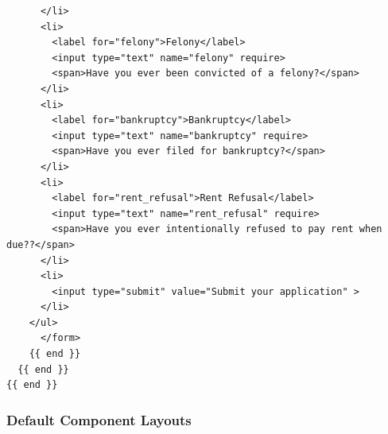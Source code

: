 \documentclass[11pt]{article}
\begin{document}
\begin{enumerate}
\begin{verbatim}
	  </li>
	  <li>
	    <label for="felony">Felony</label>
	    <input type="text" name="felony" require>
	    <span>Have you ever been convicted of a felony?</span>
	  </li>
	  <li>
	    <label for="bankruptcy">Bankruptcy</label>
	    <input type="text" name="bankruptcy" require>
	    <span>Have you ever filed for bankruptcy?</span>
	  </li>
	  <li>
	    <label for="rent_refusal">Rent Refusal</label>
	    <input type="text" name="rent_refusal" require>
	    <span>Have you ever intentionally refused to pay rent when due??</span>
	  </li>
	  <li>
	    <input type="submit" value="Submit your application" >
	  </li>
	</ul>
      </form>
    {{ end }}
  {{ end }}
{{ end }}
\end{verbatim}
\end{enumerate}
\subsubsection{Default Component Layouts}
\label{sec:org49abdc7}
\end{document}
